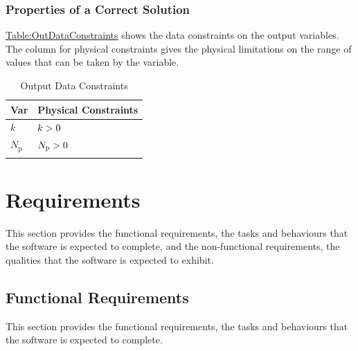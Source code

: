 \documentclass[12pt]{article}
\newcommand{\gt}{\ensuremath >}
\begin{document}
\subsubsection{Properties of a Correct Solution}
\label{Sec:CorSolProps}
\hyperref[Table:OutDataConstraints]{Table:OutDataConstraints} shows the data constraints on the output variables. The column for physical constraints gives the physical limitations on the range of values that can be taken by the variable.

\begin{longtable}{l l}
\toprule
\textbf{Var} & \textbf{Physical Constraints}
\\
\midrule
\endhead
$k$ & $k\gt{}0$
\\
${N_{\text{p}}}$ & ${N_{\text{p}}}\gt{}0$
\\
\bottomrule
\caption{Output Data Constraints}
\label{Table:OutDataConstraints}
\end{longtable}
\section{Requirements}
\label{Sec:Requirements}
This section provides the functional requirements, the tasks and behaviours that the software is expected to complete, and the non-functional requirements, the qualities that the software is expected to exhibit.

\subsection{Functional Requirements}
\label{Sec:FRs}
This section provides the functional requirements, the tasks and behaviours that the software is expected to complete.
\end{document}
